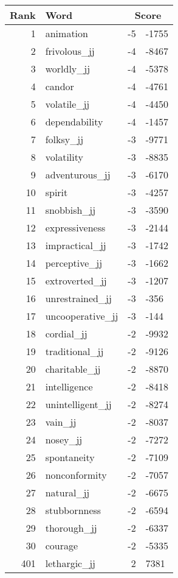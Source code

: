 \begin{longtable}[!htbp]{| rlr@{.}l |}
    \hline
    \textbf{Rank} & \textbf{Word} & \multicolumn{2}{c|}{\textbf{Score}} \\
    \hline
    \endhead
    1 & animation & -5 & -1755 \\
    2 & frivolous\_jj & -4 & -8467 \\
    3 & worldly\_jj & -4 & -5378 \\
    4 & candor & -4 & -4761 \\
    5 & volatile\_jj & -4 & -4450 \\
    6 & dependability & -4 & -1457 \\
    7 & folksy\_jj & -3 & -9771 \\
    8 & volatility & -3 & -8835 \\
    9 & adventurous\_jj & -3 & -6170 \\
    10 & spirit & -3 & -4257 \\
    11 & snobbish\_jj & -3 & -3590 \\
    12 & expressiveness & -3 & -2144 \\
    13 & impractical\_jj & -3 & -1742 \\
    14 & perceptive\_jj & -3 & -1662 \\
    15 & extroverted\_jj & -3 & -1207 \\
    16 & unrestrained\_jj & -3 & -356 \\
    17 & uncooperative\_jj & -3 & -144 \\
    18 & cordial\_jj & -2 & -9932 \\
    19 & traditional\_jj & -2 & -9126 \\
    20 & charitable\_jj & -2 & -8870 \\
    21 & intelligence & -2 & -8418 \\
    22 & unintelligent\_jj & -2 & -8274 \\
    23 & vain\_jj & -2 & -8037 \\
    24 & nosey\_jj & -2 & -7272 \\
    25 & spontaneity & -2 & -7109 \\
    26 & nonconformity & -2 & -7057 \\
    27 & natural\_jj & -2 & -6675 \\
    28 & stubbornness & -2 & -6594 \\
    29 & thorough\_jj & -2 & -6337 \\
    30 & courage & -2 & -5335 \\
    401 & lethargic\_jj & 2 & 7381 \\

\end{longtable}
